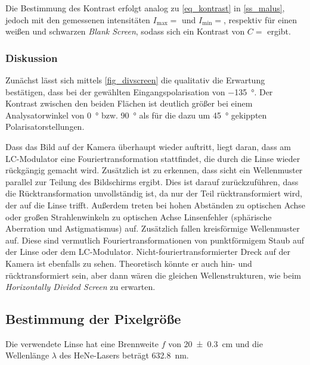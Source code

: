 \documentclass[
	a4paper,
	12pt,
	pagesize,
	ngerman
]{scrartcl}
\begin{document}
		Die Bestimmung des Kontrast erfolgt analog zu \cref{eq_kontrast} in \cref{ss_malus}, jedoch mit  den gemessenen intensitäten $I_\text{max}=$ und $I_\text{min}=$, respektiv für einen weißen und schwarzen \textit{Blank Screen}, sodass sich ein Kontrast von $C=$ ergibt.
			\subsubsection*{Diskussion}
			Zunächst lässt sich mittels \cref{fig_divscreen} die qualitativ die Erwartung bestätigen, dass bei der gewählten Eingangspolarisation von \SI{-135}{\degree}.
			Der Kontrast zwischen den beiden Flächen ist deutlich größer bei einem Analysatorwinkel von \SI{0}{\degree} bzw. \SI{90}{\degree} als für die dazu um \SI{45}{\degree} gekippten Polarisatorstellungen.

			Dass das Bild auf der Kamera überhaupt wieder auftritt, liegt daran, dass am LC-Modulator eine Fouriertransformation stattfindet, die durch die Linse wieder rückgängig gemacht wird.
			Zusätzlich ist zu erkennen, dass sicht ein Wellenmuster parallel zur Teilung des Bildschirms ergibt.
			Dies ist darauf zurückzuführen, dass die Rücktransformation unvollständig ist, da nur der Teil rücktransformiert wird, der auf die Linse trifft.
			Außerdem treten bei hohen Abständen zu optischen Achse oder großen Strahlenwinkeln zu optischen Achse Linsenfehler (sphärische Aberration und Astigmatismus) auf.
			Zusätzlich fallen kreisförmige Wellenmuster auf.
			Diese sind vermutlich Fouriertransformationen von punktförmigem Staub auf der Linse oder dem LC-Modulator.
			Nicht-fouriertransformierter Dreck auf der Kamera ist ebenfalls zu sehen.
			Theoretisch könnte er auch hin- und rücktransformiert sein, aber dann wären die gleichen Wellenstrukturen, wie beim \textit{Horizontally Divided Screen} zu erwarten.

		\subsection{Bestimmung der Pixelgröße} %
		Die verwendete Linse hat eine Brennweite $f$ von \SI{20+-0.3}{cm} und die Wellenlänge $\lambda$ des HeNe-Lasers beträgt \SI{632.8}{nm}.
\end{document}
